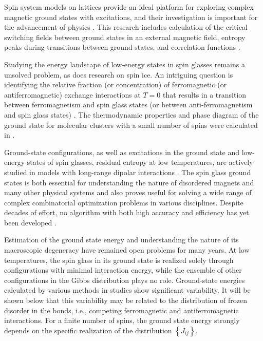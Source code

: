 \documentclass[preprint,12pt]{elsarticle}
\begin{document}
	Spin system models on lattices provide an ideal platform for exploring complex magnetic ground states with excitations, and their investigation is important for the advancement of physics \cite{lacroix2011introduction}. This research includes calculation of the critical switching fields between ground states in an external magnetic field, entropy peaks during transitions between ground states, and correlation functions \cite{ramirez2004effect, rosas2004random, andriushchenko2019large}.  
	
	Studying the energy landscape of low-energy states in spin glasses \cite{biswas2023energy} remains a unsolved problem, as does research on spin ice. An intriguing question is identifying the relative fraction (or concentration) of ferromagnetic (or antiferromagnetic) exchange interactions at $T=0$ that results in a transition between ferromagnetism and spin glass states (or between anti-ferromagnetism and spin glass states) \cite{gruzberg2001random, honecker2001universality, picco2006strong, tsomokos2011interplay, zimmer2022role}. The thermodynamic properties and phase diagram of the ground state for molecular clusters with a small number of spins were calculated in \cite{dias2023ground}.
	
	Ground-state configurations, as well as excitations in the ground state and low-energy states of spin glasses, residual entropy at low temperatures, are actively studied in models with long-range dipolar interactions \cite{makarova2021low, singh2024micromagnetic}. The spin glass ground states is both essential for understanding the nature of disordered magnets and many other physical systems and also proves useful for solving a wide range of complex combinatorial optimization problems in various disciplines. Despite decades of effort, no algorithm with both high accuracy and efficiency has yet been developed \cite{fan2023searching}.  
	
	Estimation of the ground state energy and understanding the nature of its macroscopic degeneracy have remained open problems for many years. At low temperatures, the spin glass in its ground state is realized solely through configurations with minimal interaction energy, while the ensemble of other configurations in the Gibbs distribution plays no role. Ground-state energies calculated by various methods in studies \cite{thouless1977solution, sherrington1975solvable, tanaka1980analytic, klein1976comparison, kirkpatrick1978infinite, karandashev2019global, palmer1999ground, campbell2004energy, roma2009ground} show significant variability. It will be shown below that this variability may be related to the distribution of frozen disorder in the bonds, i.e., competing ferromagnetic and antiferromagnetic interactions. For a finite number of spins, the ground state energy strongly depends on the specific realization of the distribution $\left\lbrace J_{ij} \right\rbrace$.  
	
\end{document}
